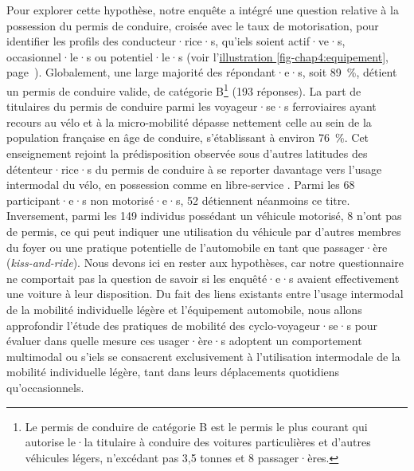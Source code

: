 \begin{refsegment}
Pour explorer cette hypothèse, notre enquête a intégré une question relative à la possession du permis de conduire, croisée avec le taux de motorisation, pour identifier les profils des conducteur·rice·s, qu'iels soient actif·ve·s, occasionnel·le·s ou potentiel·le·s (voir l'\hyperref[fig-chap4:equipement]{illustration \ref{fig-chap4:equipement}}, page~\pageref{fig-chap4:equipement}). Globalement, une large majorité des répondant·e·s, soit 89~\%, détient un permis de conduire valide, de catégorie B\footnote{
    Le permis de conduire de catégorie B est le permis le plus courant qui autorise le·la titulaire à conduire des voitures particulières et d'autres véhicules légers, n'excédant pas 3,5 tonnes et 8 passager·ères.
} (193 réponses). La part de titulaires du permis de conduire parmi les voyageur·se·s ferroviaires ayant recours au vélo et à la micro-mobilité dépasse nettement celle au sein de la population française en âge de conduire, s'établissant à environ 76~\%. Cet enseignement rejoint la prédisposition observée sous d'autres latitudes des détenteur·rice·s du permis de conduire à se reporter davantage vers l'usage intermodal du vélo, en possession comme en libre-service \textcolor{blue}{\autocites[111]{bachand-marleau_much-anticipated_2011}[215]{lin_built_2018}[7]{hamidi_shaping_2020}}. Parmi les 68 participant·e·s non motorisé·e·s, 52 détiennent néanmoins ce titre. Inversement, parmi les 149 individus possédant un véhicule motorisé, 8 n'ont pas de permis, ce qui peut indiquer une utilisation du véhicule par d'autres membres du foyer ou une pratique potentielle de l'automobile en tant que passager·ère (\textsl{kiss-and-ride}). Nous devons ici en rester aux hypothèses, car notre questionnaire ne comportait pas la question de savoir si les enquêté·e·s avaient effectivement une voiture à leur disposition. Du fait des liens existants entre l'usage intermodal de la mobilité individuelle légère et l'équipement automobile, nous allons approfondir l'étude des pratiques de mobilité des cyclo-voyageur·se·s pour évaluer dans quelle mesure ces usager·ère·s adoptent un comportement multimodal ou s'iels se consacrent exclusivement à l'utilisation intermodale de la mobilité individuelle légère, tant dans leurs déplacements quotidiens qu'occasionnels.%


\end{refsegment}
